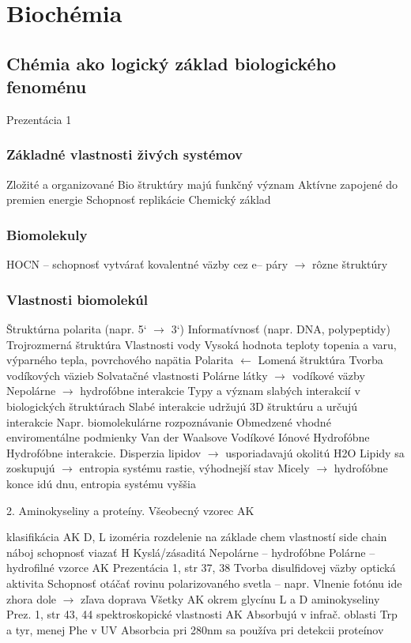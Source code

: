 \chapter[Biochémia]{Biochémia}

\label{biochemia} %

\section{Chémia ako logický základ biologického fenoménu}
Prezentácia 1
\subsection{Základné vlastnosti živých systémov}
Zložité a organizované
Bio štruktúry majú funkčný význam
Aktívne zapojené do premien energie
Schopnosť replikácie
Chemický základ
\subsection{Biomolekuly}
HOCN -- schopnosť vytvárať kovalentné väzby cez e-- páry $\rightarrow$ rôzne štruktúry
\subsection{Vlastnosti biomolekúl}
Štruktúrna polarita (napr. 5` $\rightarrow$ 3`)
Informatívnosť (napr. DNA, polypeptidy)
Trojrozmerná štruktúra
Vlastnosti vody
Vysoká hodnota teploty topenia a varu, výparného tepla, povrchového napätia
Polarita $\leftarrow$ Lomená štruktúra
Tvorba vodíkových väzieb
Solvatačné vlastnosti
    Polárne látky $\rightarrow$ vodíkové väzby
    Nepolárne $\rightarrow$ hydrofóbne interakcie
Typy a význam slabých interakcií v biologických štruktúrach
Slabé interakcie udržujú 3D štruktúru a určujú interakcie
    Napr. biomolekulárne rozpoznávanie
    Obmedzené vhodné enviromentálne podmienky
Van der Waalsove
Vodíkové
Iónové
Hydrofóbne
Hydrofóbne interakcie. 
Disperzia lipidov $\rightarrow$ usporiadavajú okolitú H2O
Lipidy sa zoskupujú $\rightarrow$ entropia systému rastie, výhodnejší stav
Micely $\rightarrow$ hydrofóbne konce idú dnu, entropia systému vyššia

2. Aminokyseliny a proteíny.
Všeobecný vzorec AK

klasifikácia AK
    D, L izoméria
    rozdelenie na základe chem vlastností side chain
        náboj
        schopnosť viazať H
        Kyslá/zásaditá
    Nepolárne -- hydrofóbne
    Polárne -- hydrofilné
vzorce AK
Prezentácia 1, str 37, 38
Tvorba disulfidovej väzby
optická aktivita
Schopnosť otáčať rovinu polarizovaného svetla -- napr. Vlnenie fotónu ide zhora dole $\rightarrow$ zľava doprava
Všetky AK okrem glycínu
L a D aminokyseliny 
Prez. 1, str 43, 44
spektroskopické vlastnosti AK
Absorbujú v infrač. oblasti
Trp a tyr, menej Phe v UV
Absorbcia pri 280nm sa používa pri detekcii proteínov

